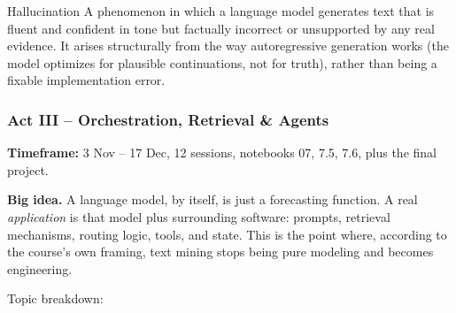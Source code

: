 \begin{defbox}{Hallucination}
A phenomenon in which a language model generates text that is fluent and confident in tone but factually incorrect or unsupported by any real evidence.  It arises structurally from the way autoregressive generation works (the model optimizes for plausible continuations, not for truth), rather than being a fixable implementation error.
\end{defbox}

\subsubsection{Act III -- Orchestration, Retrieval \& Agents}

\textbf{Timeframe:} 3 Nov -- 17 Dec, 12 sessions, notebooks 07, 7.5, 7.6, plus the final project.

\textbf{Big idea.} A language model, by itself, is just a forecasting function. A real \emph{application} is that model plus surrounding software: prompts, retrieval mechanisms, routing logic, tools, and state. This is the point where, according to the course's own framing, text mining stops being pure modeling and becomes engineering.

Topic breakdown:


